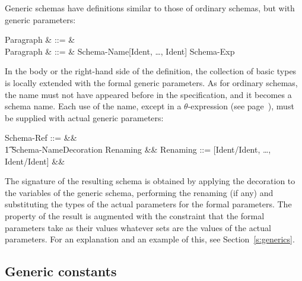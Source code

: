 Generic schemas have definitions similar to
those of ordinary schemas, but with generic parameters:
\begin{syntax}
    Paragraph & ::= & %
        \qquad {} \\
\noalign{\vskip\normalbaselineskip}
    Paragraph & ::= &
	Schema-Name[Ident, \ldots, Ident]  Schema-Exp
\end{syntax}
In the body or the right-hand side of the definition, the collection
of basic types is locally extended with the formal generic parameters.
As for ordinary schemas, the name must not have appeared before in the
specification, and it becomes a schema name.  Each
use of the name, except in a $\theta$-expression (see
page~\pageref{p:theta}), must be supplied with actual generic
parameters:
\begin{syntax}
Schema-Ref ::= &&\\
\t1	Schema-Name\;Decoration\;
	 \ropt\;
	\lopt Renaming \ropt &&
\also
Renaming ::= [Ident/Ident, \ldots, Ident/Ident] &&
\end{syntax} 
The signature of the resulting schema is obtained by applying the
decoration to the variables of the generic schema, performing the
renaming (if any) and substituting the
types of the actual parameters for the formal parameters.  The
property of the result is augmented with the constraint that the
formal parameters take as their values whatever sets are the values
of the actual parameters.  For an explanation and an example of
this, see Section~\ref{s:generics}.

\subsection{Generic constants}\label{ss:genconst}

